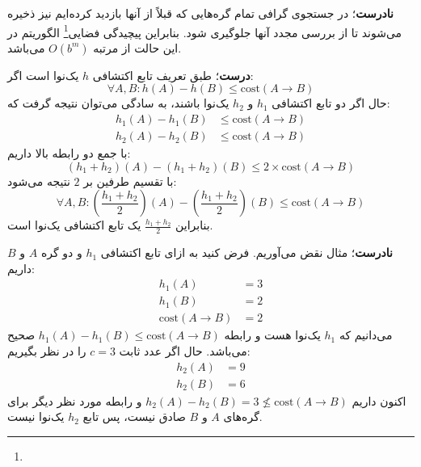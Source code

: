 \question{}

\begin{ابجد}
\item \textbf{نادرست}؛ در جستجوی گرافی تمام گره‌هایی که قبلاً از آنها بازدید کرده‌ایم نیز ذخیره می‌شوند تا از بررسی مجدد آنها جلوگیری شود. بنابراین پیچیدگی فضایی\footnote{} الگوریتم  در این حالت از مرتبه $O(b^m)$ می‌باشد.

\item \textbf{درست}؛ طبق تعریف تابع اکتشافی $h$ یک‌نوا است اگر:
\[ \forall A, B: h(A) - h(B) \leq \mathrm{cost}(A \to B) \]
حال اگر دو تابع اکتشافی $h_1$ و $h_2$ یک‌نوا باشند، به سادگی می‌توان نتیجه گرفت که:
\begin{align*}
    h_1(A) - h_1(B) & \leq \mathrm{cost}(A \to B) \\
    h_2(A) - h_2(B) & \leq \mathrm{cost}(A \to B)
\end{align*}
با جمع دو رابطه بالا داریم:
\[ (h_1 + h_2)(A) - (h_1 + h_2)(B) \leq 2 \times \mathrm{cost}(A \to B) \]
با تقسیم طرفین بر $2$ نتیجه می‌شود:
\[ \forall A, B: \left(\frac{h_1 + h_2}{2}\right)(A) - \left(\frac{h_1 + h_2}{2}\right)(B) \leq \mathrm{cost}(A \to B) \]
بنابراین $\frac{h_1 + h_2}{2}$ یک تابع اکتشافی یک‌نوا است.

\item \textbf{نادرست}؛ مثال نقض می‌آوریم. فرض کنید به ازای تابع اکتشافی $h_1$ و دو گره $A$ و $B$ داریم:
\begin{align*}
    h_1(A)                 & = 3 \\
    h_1(B)                 & = 2 \\
    \mathrm{cost}(A \to B) & = 2
\end{align*}
می‌دانیم که $h_1$ یک‌نوا هست و رابطه $h_1(A) - h_1(B) \leq \mathrm{cost}(A \to B)$ صحیح می‌باشد. حال اگر عدد ثابت $c = 3$ را در نظر بگیریم:
\begin{align*}
    h_2(A) & = 9 \\
    h_2(B) & = 6
\end{align*}
اکنون داریم $h_2(A) - h_2(B) = 3 \nleq \mathrm{cost}(A \to B)$ و رابطه مورد نظر دیگر برای گره‌های $A$ و $B$ صادق نیست، پس تابع $h_2$ یک‌نوا نیست.


\end{ابجد}
